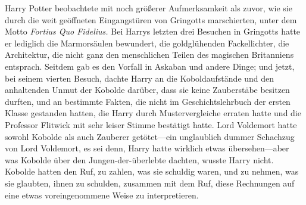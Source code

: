 Harry Potter beobachtete mit noch größerer Aufmerksamkeit als zuvor, wie sie durch die weit geöffneten Eingangstüren von Gringotts marschierten, unter dem Motto \emph{Fortius Quo Fidelius.} Bei Harrys letzten drei Besuchen in Gringotts hatte er lediglich die Marmorsäulen bewundert, die goldglühenden Fackellichter, die Architektur, die nicht ganz den menschlichen Teilen des magischen Britanniens entsprach. Seitdem gab es den Vorfall in Askaban und andere Dinge; und jetzt, bei seinem vierten Besuch, dachte Harry an die Koboldaufstände und den anhaltenden Unmut der Kobolde darüber, dass sie keine Zauberstäbe besitzen durften, und an bestimmte Fakten, die nicht im Geschichtslehrbuch der ersten Klasse gestanden hatten, die Harry durch Mustervergleiche erraten hatte und die Professor Flitwick mit sehr leiser Stimme bestätigt hatte.
Lord Voldemort hatte sowohl Kobolde als auch Zauberer getötet—ein unglaublich dummer Schachzug von Lord Voldemort, es sei denn, Harry hatte wirklich etwas übersehen—aber was Kobolde über den Jungen-der-überlebte dachten, wusste Harry nicht. Kobolde hatten den Ruf, zu zahlen, was sie schuldig waren, und zu nehmen, was sie glaubten, ihnen zu schulden, zusammen mit dem Ruf, diese Rechnungen auf eine etwas voreingenommene Weise zu interpretieren.

